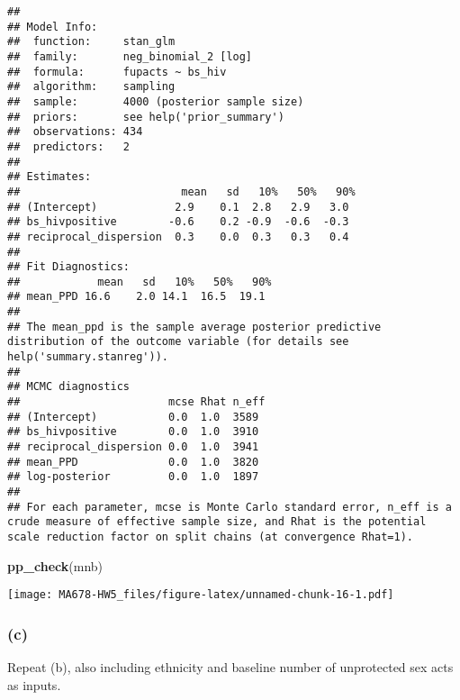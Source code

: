 \documentclass[
]{article}
\newenvironment{Shaded}{\begin{snugshade}}{\end{snugshade}}
\newcommand{\FunctionTok}[1]{\textcolor[rgb]{0.13,0.29,0.53}{\textbf{#1}}}
\newcommand{\NormalTok}[1]{#1}
\begin{document}
\begin{verbatim}
## 
## Model Info:
##  function:     stan_glm
##  family:       neg_binomial_2 [log]
##  formula:      fupacts ~ bs_hiv
##  algorithm:    sampling
##  sample:       4000 (posterior sample size)
##  priors:       see help('prior_summary')
##  observations: 434
##  predictors:   2
## 
## Estimates:
##                         mean   sd   10%   50%   90%
## (Intercept)            2.9    0.1  2.8   2.9   3.0 
## bs_hivpositive        -0.6    0.2 -0.9  -0.6  -0.3 
## reciprocal_dispersion  0.3    0.0  0.3   0.3   0.4 
## 
## Fit Diagnostics:
##            mean   sd   10%   50%   90%
## mean_PPD 16.6    2.0 14.1  16.5  19.1 
## 
## The mean_ppd is the sample average posterior predictive distribution of the outcome variable (for details see help('summary.stanreg')).
## 
## MCMC diagnostics
##                       mcse Rhat n_eff
## (Intercept)           0.0  1.0  3589 
## bs_hivpositive        0.0  1.0  3910 
## reciprocal_dispersion 0.0  1.0  3941 
## mean_PPD              0.0  1.0  3820 
## log-posterior         0.0  1.0  1897 
## 
## For each parameter, mcse is Monte Carlo standard error, n_eff is a crude measure of effective sample size, and Rhat is the potential scale reduction factor on split chains (at convergence Rhat=1).
\end{verbatim}

\begin{Shaded}
\begin{Highlighting}[]
\FunctionTok{pp\_check}\NormalTok{(mnb)}
\end{Highlighting}
\end{Shaded}

\texttt{[image: MA678-HW5\_files/figure-latex/unnamed-chunk-16-1.pdf]}

\hypertarget{c-3}{%
\subsubsection{(c)}\label{c-3}}

Repeat (b), also including ethnicity and baseline number of unprotected
sex acts as inputs.
\end{document}
